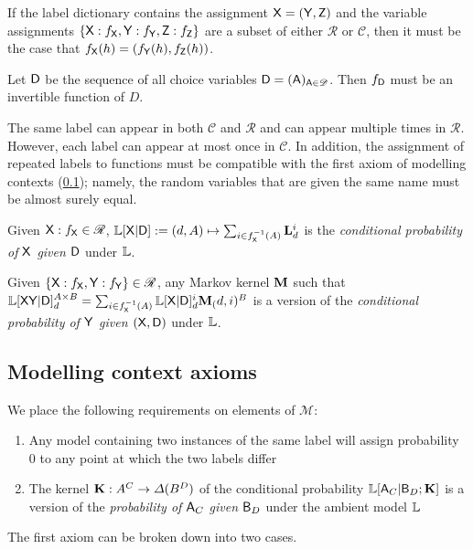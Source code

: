 If the label dictionary contains the assignment $\mathsf{X}=(\mathsf{Y},\mathsf{Z})$ and the variable assignments $\{\mathsf{X}:f_{\mathsf{X}},\mathsf{Y}:f_{\mathsf{Y}},\mathsf{Z}:f_{\mathsf{Z}}\}$ are a subset of either $\mathscr{R}$ or $\mathscr{C}$, then it must be the case that $f_{\mathsf{X}}(h)=(f_{\mathsf{Y}}(h),f_{\mathsf{Z}}(h))$.

Let $\mathsf{D}$ be the sequence of all choice variables $\mathsf{D}=(\mathsf{A})_{\mathsf{A}\in \mathscr{D}}$. Then $f_{\mathsf{D}}$ must be an invertible function of $D$.

The same label can appear in both $\mathscr{C}$ and $\mathscr{R}$ and can appear multiple times in $\mathscr{R}$. However, each label can appear at most once in $\mathscr{C}$. In addition, the assignment of repeated labels to functions must be compatible with the first axiom of modelling contexts (\ref{sec:mc_axioms}); namely, the random variables that are given the same name must be almost surely equal.

Given $\mathsf{X}:f_{\mathsf{X}}\in \mathscr{R}$, $\mathbb{L}[\mathsf{X}|\mathsf{D}]:=(d,A)\mapsto \sum_{i\in f_{\mathsf{X}}^{-1}(A)} \mathbf{L}_d^i$ is the \emph{conditional probability of $\mathsf{X}$ given $\mathsf{D}$} under $\mathbb{L}$.

Given $\{\mathsf{X}:f_{\mathsf{X}},\mathsf{Y}:f_{\mathsf{Y}}\}\in \mathscr{R}$, any Markov kernel $\mathbf{M}$ such that $\mathbb{L}[\mathsf{XY}|\mathsf{D}]_d^{A\times B} = \sum_{i\in f_{\mathsf{X}}^{-1}(A)} \mathbb{L}[\mathsf{X}|\mathsf{D}]_d^i \mathbf{M}_(d,i)^B$ is a version of the \emph{conditional probability of $\mathsf{Y}$ given $(\mathsf{X}, \mathsf{D})$} under $\mathbb{L}$.

\subsection{Modelling context axioms}\label{sec:mc_axioms}

We place the following requirements on elements of $\mathscr{M}$:

\begin{enumerate}
	\item Any model containing two instances of the same label will assign probability 0 to any point at which the two labels differ
	\item The kernel $\mathbf{K}:A^C\to \Delta(B^D)$ of the conditional probability $\mathbb{L}[\mathsf{A}_C|\mathsf{B}_D;\mathbf{K}]$ is a version of the \emph{probability of $\mathsf{A}_C$ given $\mathsf{B}_D$} under the ambient model $\mathbb{L}$
\end{enumerate}

The first axiom can be broken down into two cases. 
